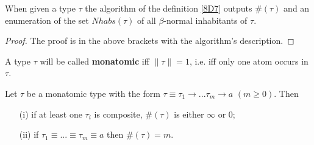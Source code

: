\documentclass[a4paper,10pt]{article}
\begin{document}
\begin{theo}\label{8D6} When given a type $\tau$ the algorithm of the definition \ref{8D7} outputs $\#(\tau)$ and an
enumeration of the set $Nhabs(\tau)$ of all $\beta$-normal inhabitants of $\tau$.
\begin{proof}
 The proof is in the above brackets with the algorithm's description. 
\end{proof}
\end{theo}

\begin{mydef}\label{8D8}
 A type $\tau$ will be called \textbf{monatomic} iff $\rVert\tau\rVert = 1$, i.e. iff only one atom occurs in $\tau$.
\end{mydef}

\begin{theo}\label{8D9} Let $\tau$ be a monatomic type with the form $\tau \equiv \tau_1 \to ... \tau_m \to a \,\, (m \geq 0)$. Then
\begin{itemize}
 \item[(i)] if at least one $\tau_i$ is composite, $\#(\tau)$ is either $\infty$ or 0;
 \item[(ii)] if $\tau_1 \equiv ... \equiv \tau_m \equiv a$ then $\#(\tau) = m$.
\end{itemize}


\end{theo}
\end{document}
